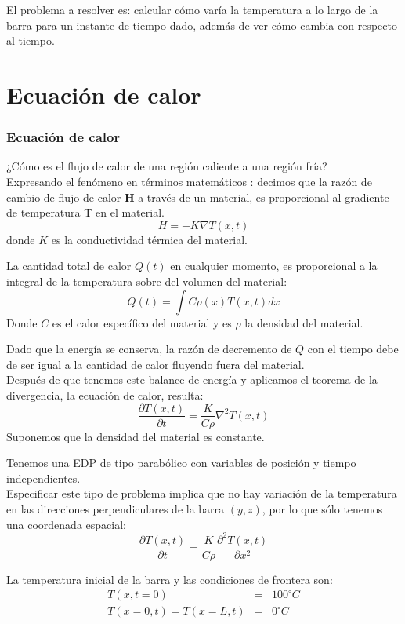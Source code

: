 \begin{frame}
El problema a resolver es: calcular cómo varía la temperatura a lo largo de la barra para un instante de tiempo dado, además de ver cómo cambia con respecto al tiempo.
\end{frame}
\section{Ecuación de calor}
\begin{frame}
\frametitle{Ecuación de calor}
¿Cómo es el flujo de calor de una región caliente a una región fría?
\\
\medskip
Expresando el fenómeno en términos matemáticos : decimos que la razón de cambio de flujo de calor \textbf{H} a través de un material, es proporcional al gradiente de temperatura T en el material.
\[H = -K \nabla T(x,t)\]
donde $K$ es la conductividad térmica del material.
\end{frame}
\begin{frame}
La cantidad total de calor $Q(t)$ en cualquier momento, es proporcional a la  integral de la temperatura sobre del volumen del material:
\[ Q(t) = \int C \rho(x) T(x,t) dx \]
Donde $C$ es el calor específico del material y  es $\rho$ la densidad del material. 
\end{frame}
\begin{frame}
Dado que la energía se conserva, la razón de decremento de $Q$ con el tiempo debe de ser igual a la cantidad de calor fluyendo fuera del material. 
\\
\medskip
Después de que tenemos este balance de energía y aplicamos el teorema de la divergencia, la ecuación de calor, resulta:
\[ \dfrac{\partial T(x,t)}{\partial t} = \dfrac{K}{C \rho} \nabla^{2} T(x,t)\]
Suponemos que la densidad del material es constante.
\end{frame}
\begin{frame}
Tenemos una EDP de tipo parabólico con variables de posición y tiempo independientes. 
\\
\medskip
Especificar este tipo de problema implica que no hay variación de la temperatura en las direcciones perpendiculares de la barra $(y, z)$, por lo que sólo tenemos una coordenada espacial:
\[ \dfrac{\partial T(x,t)}{\partial t} = \dfrac{K}{C \rho} \dfrac{\partial^{2} T(x,t)}{\partial x^{2}}\]
\end{frame}
\begin{frame}
La temperatura inicial de la barra y las condiciones de frontera son:
\begin{eqnarray*}
T(x,t=0) &=& 100^{\circ} C \\
T(x=0,t) = T(x=L,t) &=& 0^{\circ} C
\end{eqnarray*}
\end{frame}

